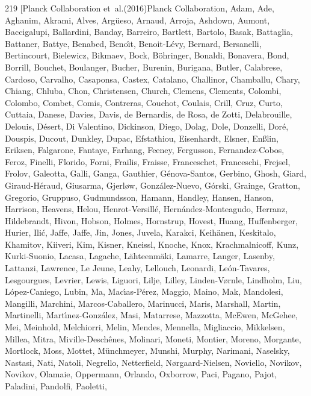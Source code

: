 \documentclass{aa}
\begin{document}
\begin{thebibliography}{219}
	\bibitem[{{Planck Collaboration} {et~al.}(2016){Planck Collaboration}, {Adam}, {Ade}, {Aghanim}, {Akrami}, {Alves}, {Arg{\"u}eso}, {Arnaud}, {Arroja}, {Ashdown}, {Aumont}, {Baccigalupi}, {Ballardini}, {Banday}, {Barreiro}, {Bartlett}, {Bartolo}, {Basak}, {Battaglia}, {Battaner}, {Battye}, {Benabed}, {Beno{\^\i}t}, {Benoit-L{\'e}vy}, {Bernard}, {Bersanelli}, {Bertincourt}, {Bielewicz}, {Bikmaev}, {Bock}, {B{\"o}hringer}, {Bonaldi}, {Bonavera}, {Bond}, {Borrill}, {Bouchet}, {Boulanger}, {Bucher}, {Burenin}, {Burigana}, {Butler}, {Calabrese}, {Cardoso}, {Carvalho}, {Casaponsa}, {Castex}, {Catalano}, {Challinor}, {Chamballu}, {Chary}, {Chiang}, {Chluba}, {Chon}, {Christensen}, {Church}, {Clemens}, {Clements}, {Colombi}, {Colombo}, {Combet}, {Comis}, {Contreras}, {Couchot}, {Coulais}, {Crill}, {Cruz}, {Curto}, {Cuttaia}, {Danese}, {Davies}, {Davis}, {de Bernardis}, {de Rosa}, {de Zotti}, {Delabrouille}, {Delouis}, {D{\'e}sert}, {Di Valentino}, {Dickinson}, {Diego}, {Dolag}, {Dole}, {Donzelli}, {Dor{\'e}},
		{Douspis}, {Ducout}, {Dunkley}, {Dupac}, {Efstathiou}, {Eisenhardt}, {Elsner}, {En{\ss}lin}, {Eriksen}, {Falgarone}, {Fantaye}, {Farhang}, {Feeney}, {Fergusson}, {Fernandez-Cobos}, {Feroz}, {Finelli}, {Florido}, {Forni}, {Frailis}, {Fraisse}, {Franceschet}, {Franceschi}, {Frejsel}, {Frolov}, {Galeotta}, {Galli}, {Ganga}, {Gauthier}, {G{\'e}nova-Santos}, {Gerbino}, {Ghosh}, {Giard}, {Giraud-H{\'e}raud}, {Giusarma}, {Gjerl{\o}w}, {Gonz{\'a}lez-Nuevo}, {G{\'o}rski}, {Grainge}, {Gratton}, {Gregorio}, {Gruppuso}, {Gudmundsson}, {Hamann}, {Handley}, {Hansen}, {Hanson}, {Harrison}, {Heavens}, {Helou}, {Henrot-Versill{\'e}}, {Hern{\'a}ndez-Monteagudo}, {Herranz}, {Hildebrandt}, {Hivon}, {Hobson}, {Holmes}, {Hornstrup}, {Hovest}, {Huang}, {Huffenberger}, {Hurier}, {Ili{\'c}}, {Jaffe}, {Jaffe}, {Jin}, {Jones}, {Juvela}, {Karakci}, {Keih{\"a}nen}, {Keskitalo}, {Khamitov}, {Kiiveri}, {Kim}, {Kisner}, {Kneissl}, {Knoche}, {Knox}, {Krachmalnicoff}, {Kunz}, {Kurki-Suonio}, {Lacasa}, {Lagache}, {L{\"a}hteenm{\"a}ki},
		{Lamarre}, {Langer}, {Lasenby}, {Lattanzi}, {Lawrence}, {Le Jeune}, {Leahy}, {Lellouch}, {Leonardi}, {Le{\'o}n-Tavares}, {Lesgourgues}, {Levrier}, {Lewis}, {Liguori}, {Lilje}, {Lilley}, {Linden-V{\o}rnle}, {Lindholm}, {Liu}, {L{\'o}pez-Caniego}, {Lubin}, {Ma}, {Mac{\'\i}as-P{\'e}rez}, {Maggio}, {Maino}, {Mak}, {Mandolesi}, {Mangilli}, {Marchini}, {Marcos-Caballero}, {Marinucci}, {Maris}, {Marshall}, {Martin}, {Martinelli}, {Mart{\'\i}nez-Gonz{\'a}lez}, {Masi}, {Matarrese}, {Mazzotta}, {McEwen}, {McGehee}, {Mei}, {Meinhold}, {Melchiorri}, {Melin}, {Mendes}, {Mennella}, {Migliaccio}, {Mikkelsen}, {Millea}, {Mitra}, {Miville-Desch{\^e}nes}, {Molinari}, {Moneti}, {Montier}, {Moreno}, {Morgante}, {Mortlock}, {Moss}, {Mottet}, {M{\"u}nchmeyer}, {Munshi}, {Murphy}, {Narimani}, {Naselsky}, {Nastasi}, {Nati}, {Natoli}, {Negrello}, {Netterfield}, {N{\o}rgaard-Nielsen}, {Noviello}, {Novikov}, {Novikov}, {Olamaie}, {Oppermann}, {Orlando}, {Oxborrow}, {Paci}, {Pagano}, {Pajot}, {Paladini}, {Pandolfi}, {Paoletti},
}
\end{thebibliography}
\end{document}
